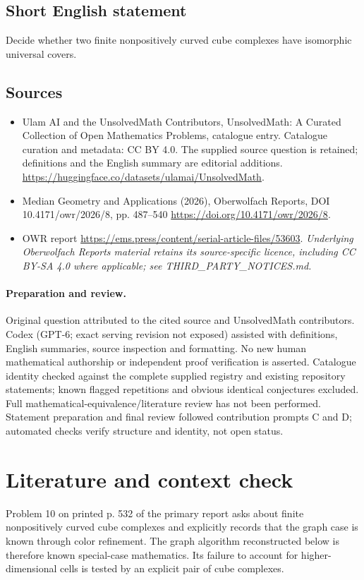 \documentclass[11pt]{article}
\begin{document}
\subsection{Short English statement}
Decide whether two finite nonpositively curved cube complexes have isomorphic universal covers.
\subsection{Sources}
\begin{itemize}
\item[S1] Ulam AI and the UnsolvedMath Contributors, UnsolvedMath: A Curated Collection of Open Mathematics Problems, catalogue entry. Catalogue curation and metadata: CC BY 4.0. The supplied source question is retained; definitions and the English summary are editorial additions.
\url{https://huggingface.co/datasets/ulamai/UnsolvedMath}.
\item[S2] Median Geometry and Applications (2026), Oberwolfach Reports, DOI 10.4171/owr/2026/8, pp. 487--540
\url{https://doi.org/10.4171/owr/2026/8}.
\item[S3] OWR report
\url{https://ems.press/content/serial-article-files/53603}.
\textit{Underlying Oberwolfach Reports material retains its source-specific licence, including CC BY-SA 4.0 where applicable; see THIRD\_PARTY\_NOTICES.md.}
\end{itemize}
\paragraph{Preparation and review.}
Original question attributed to the cited source and UnsolvedMath contributors. Codex (GPT-6; exact serving revision not exposed) assisted with definitions, English summaries, source inspection and formatting. No new human mathematical authorship or independent proof verification is asserted. Catalogue identity checked against the complete supplied registry and existing repository statements; known flagged repetitions and obvious identical conjectures excluded. Full mathematical-equivalence/literature review has not been performed. Statement preparation and final review followed contribution prompts C and D; automated checks verify structure and identity, not open status.
\label{end:statement}

\section{Literature and context check}
Problem 10 on printed p. 532 of the primary report asks about finite nonpositively curved cube complexes and explicitly records that the graph case is known through color refinement. The graph algorithm reconstructed below is therefore known special-case mathematics. Its failure to account for higher-dimensional cells is tested by an explicit pair of cube complexes.
\end{document}
